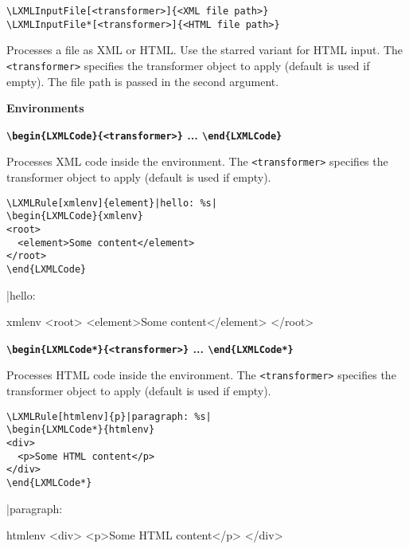 \documentclass{ltxdoc}
\begin{document}
\vtop\bgroup
\begin{verbatim}
\LXMLInputFile[<transformer>]{<XML file path>}
\LXMLInputFile*[<transformer>]{<HTML file path>}
\end{verbatim}

\noindent Processes a file as XML or HTML. Use the starred variant for HTML input. The \texttt{<transformer>} specifies the transformer object to apply (default is used if empty). The file path is passed in the second argument.
\egroup

\noindent\textbf{Environments}

\medskip
\noindent \textbf{\texttt{\textbackslash begin\{LXMLCode\}\{<transformer>\}} ... \texttt{\textbackslash end\{LXMLCode\}}}


\noindent Processes XML code inside the environment. The \texttt{<transformer>} specifies the transformer object to apply (default is used if empty).

\begin{verbatim}
\LXMLRule[xmlenv]{element}|hello: %s|
\begin{LXMLCode}{xmlenv}
<root>
  <element>Some content</element>
</root>
\end{LXMLCode}
\end{verbatim}

\begin{framed}
|hello: %
\begin{LXMLCode}{xmlenv}
<root>
  <element>Some content</element>
</root>
\end{LXMLCode}
\end{framed}

\medskip
\noindent\textbf{\texttt{\textbackslash begin\{LXMLCode*\}\{<transformer>\}} ... \texttt{\textbackslash end\{LXMLCode*\}}}

\noindent Processes HTML code inside the environment. The \texttt{<transformer>} specifies the transformer object to apply (default is used if empty).

\begin{verbatim}
\LXMLRule[htmlenv]{p}|paragraph: %s|
\begin{LXMLCode*}{htmlenv}
<div>
  <p>Some HTML content</p>
</div>
\end{LXMLCode*}
\end{verbatim}

\begin{framed}
|paragraph: %
\begin{LXMLCode*}{htmlenv}
<div>
  <p>Some HTML content</p>
</div>
\end{LXMLCode*}
\end{framed}
\end{document}
